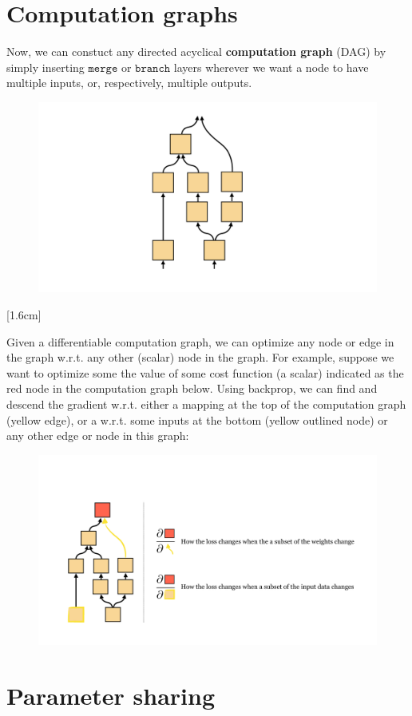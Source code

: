 \section{Computation graphs}
Now, we can constuct any directed acyclical \textbf{computation graph} (DAG) by simply inserting $\texttt{merge}$ or $\texttt{branch}$ layers wherever we want a node to have multiple inputs, or, respectively, multiple outputs.
\begin{figure}[h]
    \centering
    \includegraphics[width=0.16\linewidth]{./figures/backpropagation/DAG.pdf}
    \label{fig:backprop_DAG}
\end{figure}
[1.6cm]

Given a differentiable computation graph, we can optimize any node or edge in the graph w.r.t. any other (scalar) node in the graph. For example, suppose we want to optimize some the value of some cost function (a scalar) indicated as the red node in the computation graph below. Using backprop, we can find and descend the gradient w.r.t. either a mapping at the top of the computation graph (yellow edge), or a w.r.t. some inputs at the bottom (yellow outlined node) or any other edge or node in this graph:
\begin{figure}[h]
    \centering
    \includegraphics[width=0.9\linewidth]{./figures/backpropagation/computation_graph_opt.pdf}
    \label{fig:computation_graph_opt}
\end{figure}


\section{Parameter sharing}

